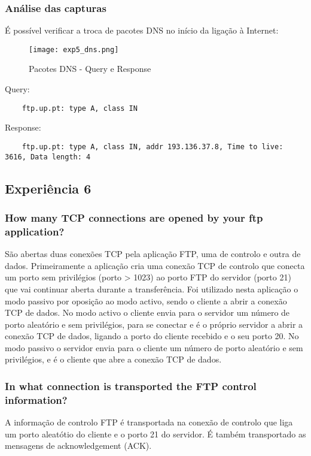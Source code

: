 \documentclass[a4paper]{article}
\begin{document}
\subsubsection{Análise das capturas}

É possível verificar a troca de pacotes DNS no início da ligação à Internet:
\begin{figure}[h]
    \centering
    \texttt{[image: exp5\_dns.png]}
    \caption{Pacotes DNS - Query e Response}
\end{figure}

Query:
\begin{verbatim}
	ftp.up.pt: type A, class IN
\end{verbatim}
Response:
\begin{verbatim}
	ftp.up.pt: type A, class IN, addr 193.136.37.8, Time to live: 3616, Data length: 4
\end{verbatim}

\subsection{Experiência 6}

\subsubsection{How many TCP connections are opened by your ftp application?}

São abertas duas conexões TCP pela aplicação FTP, uma de controlo e outra de dados.
Primeiramente a aplicação cria uma conexão TCP de controlo que conecta um porto sem privilégios (porto > 1023) ao porto FTP do servidor (porto 21) que vai continuar aberta durante a transferência.
Foi utilizado nesta aplicação o modo passivo por oposição ao modo activo, sendo o cliente a abrir a conexão TCP de dados.
No modo activo o cliente envia para o servidor um número de porto aleatório e sem privilégios, para se conectar e é o próprio servidor a abrir a conexão TCP de dados, ligando a porto do cliente recebido e o seu porto 20.
No modo passivo o servidor envia para o cliente um número de porto aleatório e sem privilégios, e é o cliente que abre a conexão TCP de dados.

\subsubsection{In what connection is transported the FTP control information?}

A informação de controlo FTP é transportada na conexão de controlo que liga um porto aleatótio do cliente e o porto 21 do servidor. É também transportado as mensagens de acknowledgement (ACK).
\end{document}
